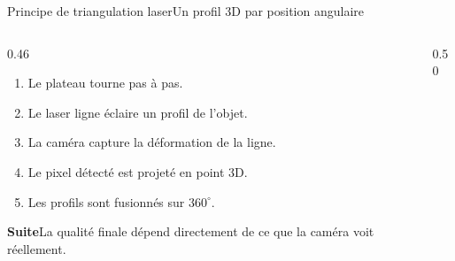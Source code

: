 \documentclass[aspectratio=169,10pt]{beamer}
\newcommand{\nextbox}[1]{%
  \begin{beamercolorbox}[wd=\linewidth,sep=0.25cm,rounded=true]{}
    \colorbox{softblue}{%
      \parbox{\dimexpr\linewidth-0.5cm\relax}{\textbf{\textcolor{deepblue}{Suite}}\quad #1}%
    }
  \end{beamercolorbox}
}
\begin{document}
\begin{frame}{Principe de triangulation laser}{Un profil 3D par position angulaire}
  \begin{columns}[T,onlytextwidth]
    \begin{column}{0.46\textwidth}
      \begin{enumerate}
        \item Le plateau tourne pas à pas.
        \item Le laser ligne éclaire un profil de l'objet.
        \item La caméra capture la déformation de la ligne.
        \item Le pixel détecté est projeté en point 3D.
        \item Les profils sont fusionnés sur $360^\circ$.
      \end{enumerate}

      \vspace{0.2cm}
      \nextbox{La qualité finale dépend directement de ce que la caméra voit réellement.}
    \end{column}
    \begin{column}{0.50\textwidth}
      \hspace{0.5cm}
      
    \end{column}
  \end{columns}
\end{frame}
\end{document}
